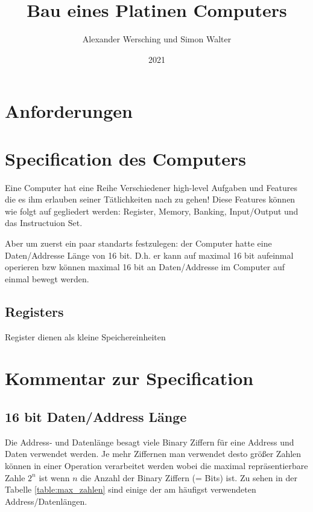 \documentclass{scrartcl}
\begin{document}
\title{Bau eines Platinen Computers}
\author{Alexander Wersching und Simon Walter}
\date{2021}
\maketitle
\newpage


\tableofcontents
\newpage

\section{Anforderungen}

\section{Specification des Computers}
Eine Computer hat eine Reihe Verschiedener high-level Aufgaben und Features die es ihm erlauben seiner Tätlichkeiten nach zu gehen! 
Diese Features können wie folgt auf gegliedert werden: Register, Memory, Banking, Input/Output und das Instructuion Set.

Aber um zuerst ein paar standarts festzulegen: der Computer hatte eine Daten/Addresse Länge von 16 bit. D.h. er kann auf 
maximal 16 bit aufeinmal operieren bzw können maximal 16 bit an Daten/Addresse im Computer auf einmal bewegt werden.

\subsection{Registers}
Register dienen als kleine Speichereinheiten 
\section{Kommentar zur Specification}

\subsection{16 bit Daten/Address Länge}
Die Address- und Datenlänge besagt viele Binary Ziffern für eine Address und Daten verwendet werden. Je mehr Ziffernen man verwendet desto größer Zahlen können in einer Operation verarbeitet werden wobei die maximal repräsentierbare Zahle $2^n$ ist wenn $n$ die Anzahl der Binary Ziffern (= Bits) ist. Zu sehen in der Tabelle \ref{table:max_zahlen} sind einige der am häufigst verwendeten Address/Datenlängen. 
\end{document}
